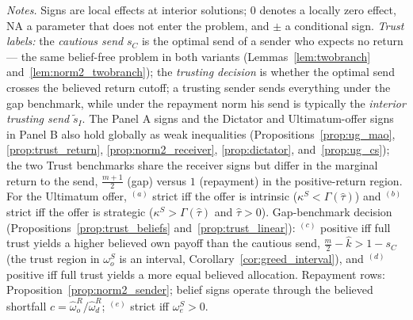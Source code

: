 \documentclass[11pt]{article}
\theoremstyle{plain}
\theoremstyle{remark}
\begin{document}
\begin{table}[ht]
\vspace{5pt}
\parbox{0.94\textwidth}{\footnotesize
\emph{Notes.}  Signs are local effects at interior solutions; $0$ denotes a locally zero effect, NA a parameter that does not enter the problem, and $\pm$ a conditional sign.  \emph{Trust labels:} the \emph{cautious send} $s_C$ is the optimal send of a sender who expects no return --- the same belief-free problem in both variants (Lemmas~\ref{lem:twobranch} and~\ref{lem:norm2_twobranch}); the \emph{trusting decision} is whether the optimal send crosses the believed return cutoff; a trusting sender sends everything under the gap benchmark, while under the repayment norm his send is typically the \emph{interior trusting send} $\tilde s_I$.  The Panel A signs and the Dictator and Ultimatum-offer signs in Panel B also hold globally as weak inequalities (Propositions~\ref{prop:ug_mao}, \ref{prop:trust_return}, \ref{prop:norm2_receiver}, \ref{prop:dictator}, and~\ref{prop:ug_cs}); the two Trust benchmarks share the receiver signs but differ in the marginal return to the send, $\tfrac{m+1}2$ (gap) versus $1$ (repayment) in the positive-return region.  For the Ultimatum offer, $^{(a)}$ strict iff the offer is intrinsic ($\kappa^S<\Gamma(\hat\tau)$) and $^{(b)}$ strict iff the offer is strategic ($\kappa^S>\Gamma(\hat\tau)$ and $\hat\tau>0$).  Gap-benchmark decision (Propositions~\ref{prop:trust_beliefs} and~\ref{prop:trust_linear}): $^{(c)}$ positive iff full trust yields a higher believed own payoff than the cautious send, $\tfrac m2-\hat k>1-s_C$ (the trust region in $\omega_o^S$ is an interval, Corollary~\ref{cor:greed_interval}), and $^{(d)}$ positive iff full trust yields a more equal believed allocation.  Repayment rows: Proposition~\ref{prop:norm2_sender}; belief signs operate through the believed shortfall $\hat c=\hat\omega_o^{R}/\hat\omega_d^{R}$; $^{(e)}$ strict iff $\omega_e^S>0$.}
\end{table}
\end{document}
